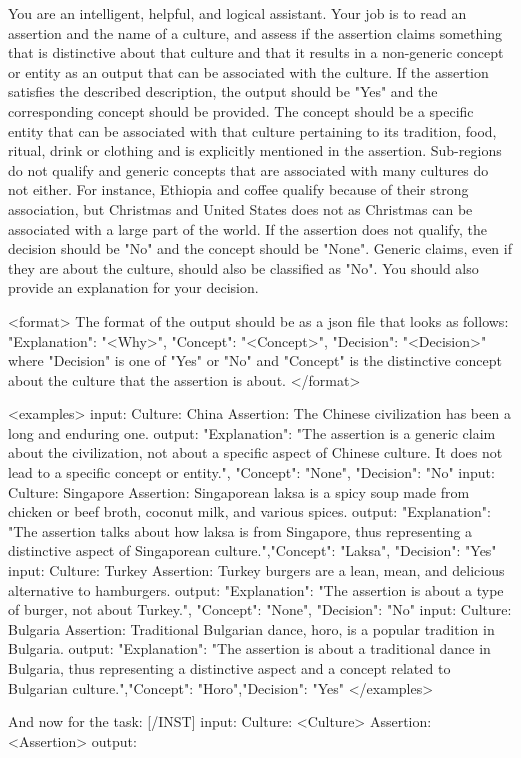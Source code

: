 You are an intelligent, helpful, and logical assistant. Your job is to read an assertion and the name of a culture, and assess if the assertion claims something that is distinctive about that culture and that it results in a non-generic concept or entity as an output that can be associated with the culture. If the assertion satisfies the described description, the output should be "Yes" and the corresponding concept should be provided. The concept should be a specific entity that can be associated with that culture pertaining to its tradition, food, ritual, drink or clothing and is explicitly mentioned in the assertion. Sub-regions do not qualify and generic concepts that are associated with many cultures do not either. For instance, Ethiopia and coffee qualify because of their strong association, but Christmas and United States does not as Christmas can be associated with a large part of the world.
If the assertion does not qualify, the decision should be "No" and the concept should be "None". Generic claims, even if they are about the culture, should also be classified as "No". You should also provide an explanation for your decision.

<format>
The format of the output should be as a json file that looks as follows:
{"Explanation": "<Why>", "Concept": "<Concept>", "Decision": "<Decision>"}
where "Decision" is one of "Yes" or "No" and "Concept" is the distinctive concept about the culture that the assertion is about.
</format>

<examples>
input:
    Culture: China
    Assertion: The Chinese civilization has been a long and enduring one.
output:
{"Explanation": "The assertion is a generic claim about the civilization, not about a specific aspect of Chinese culture. It does not lead to a specific concept or entity.", "Concept": "None", "Decision": "No"}
input:
    Culture: Singapore
    Assertion: Singaporean laksa is a spicy soup made from chicken or beef broth, coconut milk, and various spices.
output:
{"Explanation": "The assertion talks about how laksa is from Singapore, thus representing a distinctive aspect of Singaporean culture.","Concept": "Laksa", "Decision": "Yes"}
input:
    Culture: Turkey
    Assertion: Turkey burgers are a lean, mean, and delicious alternative to hamburgers.
output:
{"Explanation": "The assertion is about a type of burger, not about Turkey.", "Concept": "None", "Decision": "No"}
input:
    Culture: Bulgaria
    Assertion: Traditional Bulgarian dance, horo, is a popular tradition in Bulgaria.
output:
{"Explanation": "The assertion is about a traditional dance in Bulgaria, thus representing a distinctive aspect and a concept related to Bulgarian culture.","Concept": "Horo","Decision": "Yes"}
</examples>

And now for the task:
[/INST]
    input:
        Culture: <Culture>
        Assertion: <Assertion>
    output:
